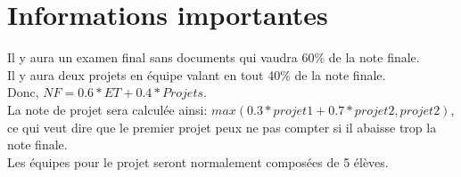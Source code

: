 \section{Informations importantes}
Il y aura un examen final sans documents qui vaudra 60\% de la note finale.\\
Il y aura deux projets en équipe valant en tout 40\% de la note finale.\\
Donc, $NF = 0.6*ET + 0.4*Projets$.\\
La note de projet sera calculée ainsi: $max(0.3*projet1 + 0.7*projet2, projet2)$,
ce qui veut dire que le premier projet peux ne pas compter si il abaisse trop la note finale.\\
Les équipes pour le projet seront normalement composées de 5 élèves.
